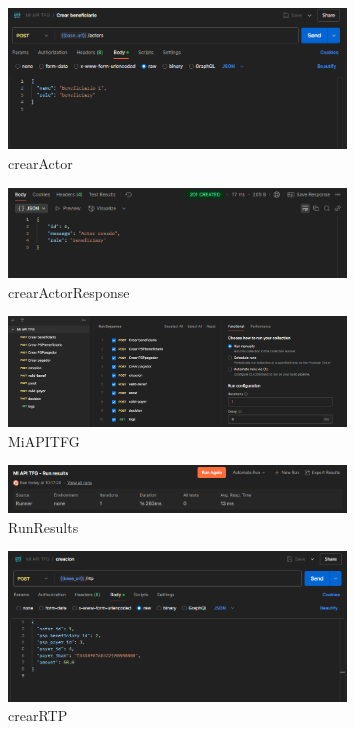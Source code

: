 \begin{figure}[H]
  \centering
  \includegraphics[width=0.8\textwidth]{Imagenes/crearActor.png}
  \caption{crearActor}
  \label{fig:crearActor}
\end{figure}

\begin{figure}[H]
  \centering
  \includegraphics[width=0.8\textwidth]{Imagenes/crearActorResponse.png}
  \caption{crearActorResponse}
  \label{fig:crearActorResponse}
\end{figure}


\begin{figure}[H]
  \centering
  \includegraphics[width=0.8\textwidth]{Imagenes/MiAPITFG.png}
  \caption{MiAPITFG}
  \label{fig:MiAPITFG}
\end{figure}

\begin{figure}[H]
  \centering
  \includegraphics[width=0.8\textwidth]{Imagenes/RunResults.png}
  \caption{RunResults}
  \label{fig:RunResults}
\end{figure}



    \begin{figure}[H]
    \centering
    \includegraphics[width=0.8\textwidth]{Imagenes/crearRTP.png}
    \caption{crearRTP}
    \label{fig:crearRTP}
    \end{figure}

